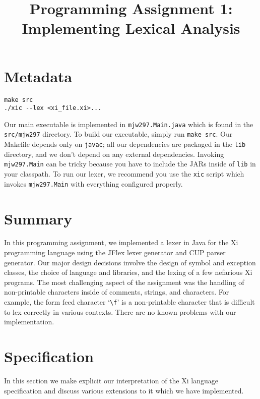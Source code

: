 \documentclass{hw}
\title{Programming Assignment 1:\\ Implementing Lexical Analysis}
\begin{document}
\maketitle

\section{Metadata}\label{sec:metadata}
\begin{center}
\begin{BVerbatim}
make src
./xic --lex <xi_file.xi>...
\end{BVerbatim}
\end{center}

Our main executable is implemented in \texttt{mjw297.Main.java} which is found
in the \texttt{src/mjw297} directory. To build our executable, simply run
\texttt{make src}. Our Makefile depends only on \texttt{javac}; all our
dependencies are packaged in the \texttt{lib} directory, and we don't depend on
any external dependencies. Invoking \texttt{mjw297.Main} can be tricky because
you have to include the JARs inside of \texttt{lib} in your classpath. To run
our lexer, we recommend you use the \texttt{xic} script which invokes
\texttt{mjw297.Main} with everything configured properly.

\section{Summary}\label{sec:summary}
In this programming assignment, we implemented a lexer in Java for the Xi
programming language using the JFlex lexer generator and CUP parser generator.
Our major design decisions involve the design of symbol and exception classes,
the choice of language and libraries, and the lexing of a few nefarious Xi
programs. The most challenging aspect of the assignment was the handling of
non-printable characters inside of comments, strings, and characters. For
example, the form feed character `\verb$\f$' is a non-printable character that
is difficult to lex correctly in various contexts. There are no known problems
with our implementation.

\section{Specification}\label{sec:specification}
In this section we make explicit our interpretation of the Xi language
specification and discuss various extensions to it which we have implemented.
\end{document}
